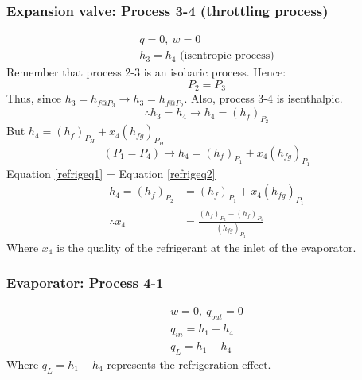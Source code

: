 \documentclass[class=report, crop=false, 12pt,a4paper]{standalone}
\begin{document}
\subsubsection{Expansion valve: Process 3-4 (throttling process)}
\begin{gather}
  q = 0, \ w = 0\\
  h_3 = h_4 \textrm{ (isentropic process)}
\end{gather}
Remember that process 2-3 is an isobaric process. Hence:
\begin{equation}
  P_2 = P_3
\end{equation}
Thus, since $h_3 = h_{f@P_3} \rightarrow h_3 = h_{f@P_2}$. Also, process 3-4 is isenthalpic.
\begin{equation}
  \therefore h_3 = h_4 \rightarrow h_4 = \left( h_f \right)_{P_2} \label{refrigeq1}
\end{equation}
But $h_4 = \left( h_f \right)_{P_H} + x_4 \left(h_{fg} \right)_{P_H}$
\begin{equation}
  (P_1 = P_4) \rightarrow h_4 = \left( h_f \right)_{P_1} + x_4 \left(h_{fg} \right)_{P_1}
  \label{refrigeq2}
\end{equation}
Equation \ref{refrigeq1} = Equation \ref{refrigeq2}
\begin{align}
  h_4 = \left( h_f \right)_{P_2} &= \left( h_f \right)_{P_1} + x_4 \left(h_{fg} \right)_{P_1}\\
  \therefore x_4 &= \frac{\left( h_f \right)_{P_2} - \left( h_f \right)_{P_1}}{\left( h_{fg} \right)_{P_1}}
\end{align}
Where $x_4$ is the quality of the refrigerant at the inlet of the evaporator.
\subsubsection{Evaporator: Process 4-1}
\begin{gather}
  w = 0, \ q_{out} = 0\\
  q_{in} = h_1 - h_4\\
  q_L = h_1 - h_4
\end{gather}
Where $q_L = h_1 - h_4$ represents the refrigeration effect.
\end{document}
